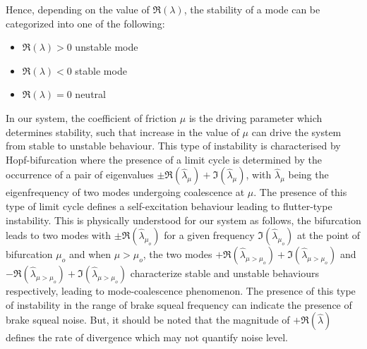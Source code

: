 Hence, depending on the value of $\Re(\lambda)$, the stability of a mode can be categorized into one of the following:
\begin{itemize}
    \item $\Re(\lambda)>0$ unstable mode
    \item $\Re(\lambda)<0$ stable mode
    \item $\Re(\lambda)= 0$ neutral 
    \end{itemize}

In our system, the coefficient of friction ${\mu}$ is the driving parameter which determines stability, such that increase in the value of ${\mu}$ can drive the system from stable to  unstable behaviour. This type of instability is characterised by Hopf-bifurcation where the presence of a limit cycle is determined by the occurrence of a pair of eigenvalues $\pm\Re(\widehat{\lambda}_{{\mu}})+\Im(\widehat{\lambda}_{{\mu}} )$, with $\widehat{\lambda}_{{\mu}}$ being the eigenfrequency of two modes undergoing coalescence at ${\mu}$. 
The presence of this type of limit cycle defines a self-excitation behaviour leading to flutter-type instability. 
This is physically understood for our system as follows, the bifurcation leads to two modes with  $\pm\Re(\widehat{\lambda}_{{\mu}_o})$ for a given frequency $\Im(\widehat{\lambda}_{{\mu}_o})$ at the point of bifurcation ${\mu}_o$ and when ${\mu} > {\mu}_o$, the two modes  $+\Re(\widehat{\lambda}_{{\mu} > {\mu}_o})+\Im(\widehat{\lambda}_{{\mu} > {\mu}_o})$ and $-\Re(\widehat{\lambda}_{{\mu} > {\mu}_o})+\Im(\widehat{\lambda}_{{\mu} > {\mu}_o})$ characterize stable and unstable behaviours respectively, leading to mode-coalescence phenomenon. 
The presence of this type of instability in the range of brake squeal frequency can indicate the presence of brake squeal noise. But, it should be noted that the magnitude of $+\Re(\widehat{\lambda})$ defines the rate of divergence which may not quantify noise level.

 


